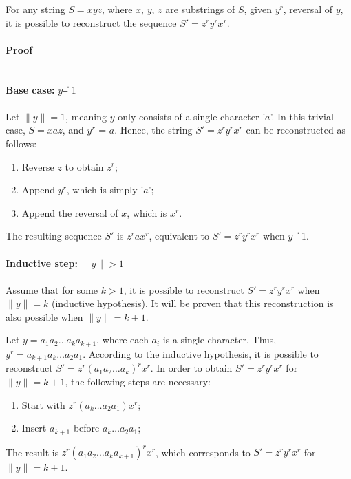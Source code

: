 \begin{theorem}
    For any string \( S = xyz \), where \( x \), \( y \), \( z \) are substrings of \( S \), given \(y^r \), reversal of \(y\), it is possible to reconstruct the sequence \( S' = z^r y^r x^r \). 
\end{theorem}
\paragraph{Proof}
\\ 
\textbf{Base case: } \|\( y \)\| = 1 \\
\\ Let \( \| y \| = 1 \), meaning \( y \) only consists of a single character '\( a \)'. In this trivial case, \( S = xaz \), and \(y^r \) = \( a \). Hence, the string \( S' = z^r y^r x^r \) can be reconstructed as follows: 
\begin{enumerate}
\item Reverse \( z \) to obtain \( z^r \);
\item Append \( y^r \), which is simply '\( a \)';
\item Append the reversal of \( x \), which is \( x^r \).
\end{enumerate}
The resulting sequence \( S' \) is \(z^r a x^r \), equivalent to \( S' = z^r y^r x^r \) when \|\( y \)\| = 1. \\
\\ \textbf{Inductive step: } \( \| y \| > 1 \) \\

\\ Assume that for some \( k > 1 \), it is possible to reconstruct \( S' = z^r y^r x^r \) when \( \| y \| = k \) (inductive hypothesis). It will be proven that this reconstruction is also possible when \( \| y \| = k + 1 \). 

Let \( y = a_1 a_2 \dots a_k a_{k+1} \), where each \( a_i \) is a single character. Thus, \( y^r = a_{k+1} a_k \dots a_2 a_1 \). According to the inductive hypothesis, it is possible to reconstruct \( S' = z^r (a_1 a_2 \dots a_k)^r x^r \). In order to obtain \( S' = z^r y^r x^r \) for \( \| y \| = k + 1 \), the following steps are necessary:
\begin{enumerate}
    \item Start with \( z^r (a_k \dots a_2 a_1) x^r \);
    \item Insert \( a_{k+1} \) before \( a_k \dots a_2 a_1 \);
\end{enumerate}
The result is \( z^r (a_1 a_2 \dots a_k a_{k+1})^r x^r \), which corresponds to \( S' = z^r y^r x^r \) for \( \| y \| = k + 1 \).


